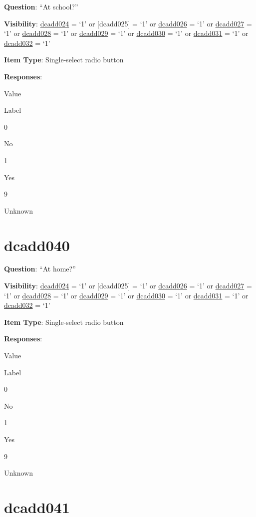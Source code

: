 \documentclass[]{book}
\begin{document}
\textbf{Question}: ``At school?''

\textbf{Visibility}: \protect\hyperlink{dcadd024}{dcadd024} = `1' or {[}dcadd025{]} = `1' or \protect\hyperlink{dcadd026}{dcadd026} = `1' or \protect\hyperlink{dcadd027}{dcadd027} = `1' or \protect\hyperlink{dcadd028}{dcadd028} = `1' or \protect\hyperlink{dcadd029}{dcadd029} = `1' or \protect\hyperlink{dcadd030}{dcadd030} = `1' or \protect\hyperlink{dcadd031}{dcadd031} = `1' or \protect\hyperlink{dcadd032}{dcadd032} = `1'

\textbf{Item Type}: Single-select radio button

\textbf{Responses}:

Value

Label

0

No

1

Yes

9

Unknown

\hypertarget{dcadd040}{%
\section{dcadd040}\label{dcadd040}}

\textbf{Question}: ``At home?''

\textbf{Visibility}: \protect\hyperlink{dcadd024}{dcadd024} = `1' or {[}dcadd025{]} = `1' or \protect\hyperlink{dcadd026}{dcadd026} = `1' or \protect\hyperlink{dcadd027}{dcadd027} = `1' or \protect\hyperlink{dcadd028}{dcadd028} = `1' or \protect\hyperlink{dcadd029}{dcadd029} = `1' or \protect\hyperlink{dcadd030}{dcadd030} = `1' or \protect\hyperlink{dcadd031}{dcadd031} = `1' or \protect\hyperlink{dcadd032}{dcadd032} = `1'

\textbf{Item Type}: Single-select radio button

\textbf{Responses}:

Value

Label

0

No

1

Yes

9

Unknown

\hypertarget{dcadd041}{%
\section{dcadd041}\label{dcadd041}}
\end{document}
